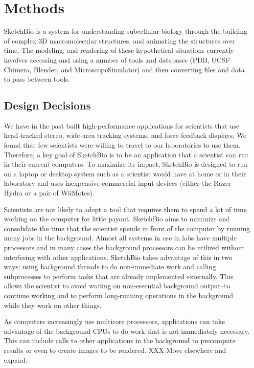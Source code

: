 \documentclass[twocolumn]{bmcart}%
\begin{document}
\section*{Methods}

SketchBio is a system for understanding subcellular biology through the building of complex 3D macromolecular structures, and animating the structures over time.   The modeling, and rendering of these hypothetical situations currently involves accessing and using a number of tools and databases (PDB, UCSF Chimera, Blender, and MicroscopeSimulator) and then converting files and data to pass between tools.

\subsection*{Design Decisions}
We have in the past built high-performance applications for scientists that use head-tracked stereo, wide-area tracking systems, and force-feedback displays.  We found that few scientists were willing to travel to our laboratories to use them.  Therefore, a key goal of SketchBio is to be an application that a scientist can run in their current computers.  
To maximize its impact, SketchBio is designed to run on a laptop or desktop system such as a scientist would have at home or in their laboratory and uses inexpensive commercial input devices (either the Razer Hydra or a pair of WiiMotes).

Scientists are not likely to adopt a tool that requires them to spend a lot of time working on the computer for little payout.  SketchBio aims to minimize and consolidate the time that the scientist spends in front of the computer by running many jobs in the background.  Almost all systems in use in labs have multiple processors and in many cases the background processors can be utilized without interfering with other applications.  SketchBio takes advantage of this in two ways: using background threads to do non-immediate work and calling subprocesses to perform tasks that are already implemented externally.  This allows the scientist to avoid waiting on non-essential background output--to continue working and to perform long-running operations in the background while they work on other things.

As computers increasingly use multicore processors, applications can take advantage of the background CPUs to do work that is not immediately necessary.  This can include calls to other applications in the background to precompute results or even to create images to be rendered.  XXX Move elsewhere and expand.
\end{document}
